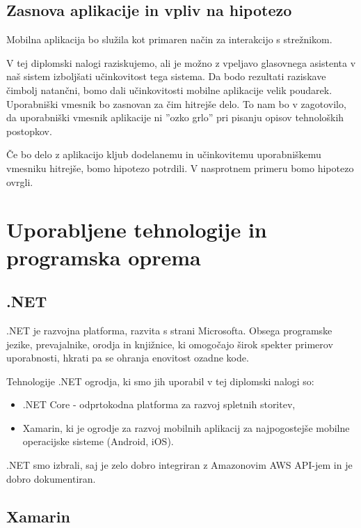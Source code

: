 \documentclass[a4paper, 12pt]{book}
\begin{document}
\subsection{Zasnova aplikacije in vpliv na hipotezo}

Mobilna aplikacija bo služila kot primaren način za interakcijo s strežnikom.

V tej diplomski nalogi raziskujemo, ali je možno z vpeljavo glasovnega asistenta v naš sistem izboljšati učinkovitost tega sistema.
Da bodo rezultati raziskave čimbolj natančni, bomo dali učinkovitosti mobilne aplikacije velik poudarek.
Uporabniški vmesnik bo zasnovan za čim hitrejše delo.
To nam bo v zagotovilo, da uporabniški vmesnik aplikacije ni ''ozko grlo'' pri pisanju opisov tehnoloških postopkov.

Če bo delo z aplikacijo kljub dodelanemu in učinkovitemu uporabniškemu vmesniku hitrejše, bomo hipotezo potrdili.
V nasprotnem primeru bomo hipotezo ovrgli.

\section{Uporabljene tehnologije in programska oprema}

\subsection{.NET}

.NET je razvojna platforma, razvita s strani Microsofta.
Obsega programske jezike, prevajalnike, orodja in knjižnice, ki omogočajo širok spekter primerov uporabnosti, hkrati pa se ohranja enovitost ozadne kode.

Tehnologije .NET ogrodja, ki smo jih uporabil v tej diplomski nalogi so:
\begin{itemize}
	\item .NET Core - odprtokodna platforma za razvoj spletnih storitev,
	\item Xamarin, ki je ogrodje za razvoj mobilnih aplikacij za najpogostejše mobilne operacijske sisteme (Android, iOS).
\end{itemize}

.NET smo izbrali, saj je zelo dobro integriran z Amazonovim AWS API-jem in je dobro dokumentiran.

\subsection{Xamarin}
\end{document}
